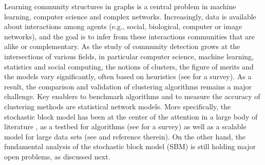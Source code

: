 \documentclass[english]{article}
\newcommand{\1}{\textbf{1}}
\begin{document}
Learning community structures in graphs is a central problem in machine learning, computer science and complex networks.   
Increasingly, data is available about interactions among agents (e.g., social, biological, computer or image networks), and the goal is to infer from these interactions communities that are alike or complementary.
As the study of community detection grows at the intersections of various fields, in particular computer science, machine learning, statistics and social computing, the notions of clusters, the figure of merits and the models vary significantly, often based on heuristics (see \cite{airoldi} for a survey). As a result, the comparison and validation of clustering algorithms remains a major challenge. Key enablers  to benchmark algorithms and to measure the accuracy of clustering methods are statistical network models. More specifically, the stochastic block model has been at the center of the attention in a large body of literature  \cite{holland,sbm1,sbm3,sbm4,sbm5,dyer,newman2,mcsherry,sbm-book,decelle,Massoulie_SBM,Mossel_SBM1,Mossel_SBM2}, as a testbed for algorithms (see \cite{sbm-algos} for a survey) as well as a scalable model for large data sets (see \cite{prem} and reference therein). On the other hand, the fundamental analysis of the stochastic block model (SBM) is still holding major open problems, as discussed next. 



\end{document}
